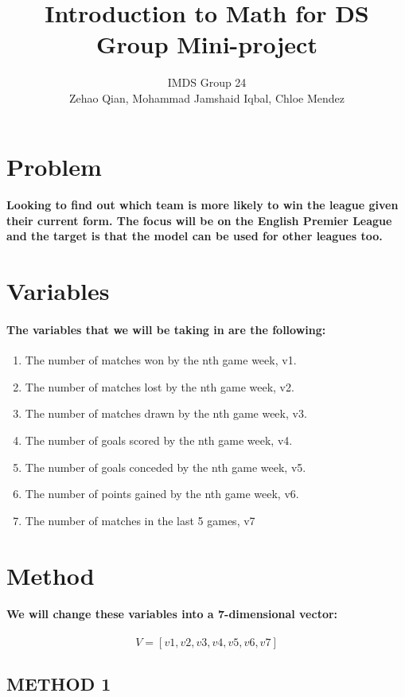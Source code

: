 \documentclass[11pt]{article} %
\title{Introduction to Math for DS Group Mini-project}
\author{IMDS Group 24 \\ Zehao Qian, Mohammad Jamshaid Iqbal, Chloe Mendez}
\begin{document}
\maketitle
% 
% 
% 
\section{Problem}
\paragraph{Looking to find out which team is more likely to win the league given their current form. The focus will be on the English Premier League and the target is that the model can be used for other leagues too.}
\section{Variables}
\paragraph{The variables that we will be taking in are the following:}
% 
% 
% 
\begin{enumerate}
    \item The number of matches won by the nth game week, v1.
    \item The number of matches lost by the nth game week, v2.
    \item The number of matches drawn by the nth game week, v3.
    \item The number of goals scored by the nth game week, v4.
    \item The number of goals conceded by the nth game week, v5.
    \item The number of points gained by the nth game week, v6.
    \item The number of matches in the last 5 games, v7
\end{enumerate}
% 
% 
% 
% 
\section{Method}
\paragraph{We will change these variables into a 7-dimensional vector:}
$$ V = [v1, v2, v3, v4, v5, v6, v7] $$
\subsection{METHOD 1}
\end{document}
